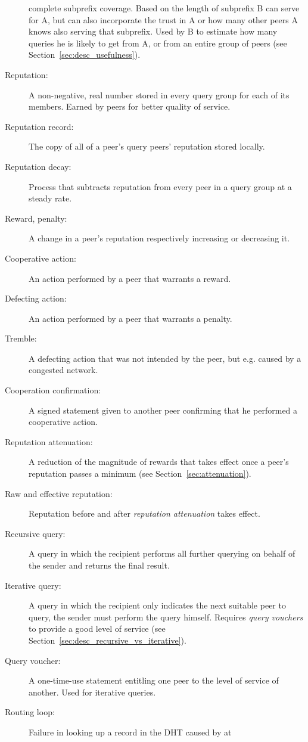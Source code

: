 \begin{description}
complete subprefix coverage. Based on the length of subprefix B can serve for A,
but can also incorporate the trust in A or how many other peers A knows also
serving that subprefix. Used by B to estimate how many queries he is likely to
get from A, or from an entire group of peers (see
Section~\ref{sec:desc_usefulness}).
\item[Reputation:] A non-negative, real number stored in every query group for
each of its members. Earned by peers for better quality of service.
\item[Reputation record:] The copy of all of a peer's query peers' reputation
stored locally.
\item[Reputation decay:] Process that subtracts reputation from every peer in a
query group at a steady rate.
\item[Reward, penalty:] A change in a peer's reputation respectively increasing
or decreasing it.
\item[Cooperative action:] An action performed by a peer that warrants a reward.
\item[Defecting action:] An action performed by a peer that warrants a penalty.
\item[Tremble:] A defecting action that was not intended by the peer, but e.g.
caused by a congested network.
\item[Cooperation confirmation:] A signed statement given to another peer
confirming that he performed a cooperative action.
\item[Reputation attenuation:] A reduction of the magnitude of rewards that
takes effect once a peer's reputation passes a minimum (see
Section~\ref{sec:attenuation}).
\item[Raw and effective reputation:] Reputation before and after
\emph{reputation attenuation} takes effect.
\item[Recursive query:] A query in which the recipient performs all further
querying on behalf of the sender and returns the final result.
\item[Iterative query:] A query in which the recipient only indicates the next
suitable peer to query, the sender must perform the query himself. Requires
\emph{query vouchers} to provide a good level of service (see
Section~\ref{sec:desc_recursive_vs_iterative}).
\item[Query voucher:] A one-time-use statement entitling one peer to the level
of service of another. Used for iterative queries.
\item[Routing loop:] Failure in looking up a record in the \ac{DHT} caused by at

\end{description}
